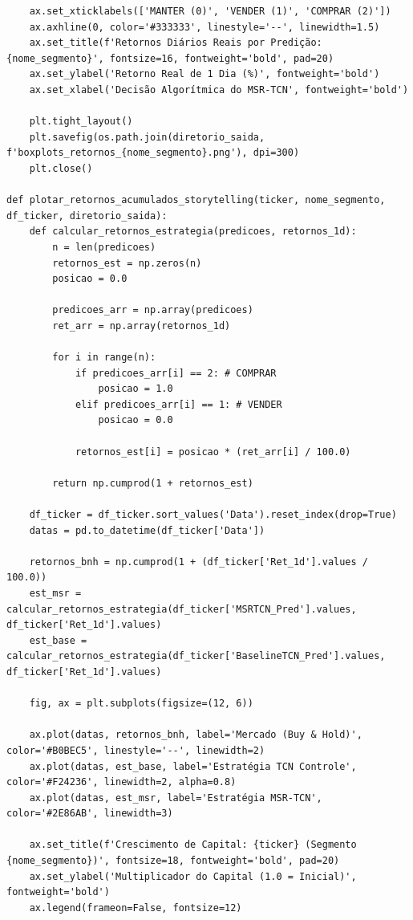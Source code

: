 \documentclass{article}
\begin{document}
\begin{verbatim}
    ax.set_xticklabels(['MANTER (0)', 'VENDER (1)', 'COMPRAR (2)'])
    ax.axhline(0, color='#333333', linestyle='--', linewidth=1.5)
    ax.set_title(f'Retornos Diários Reais por Predição: {nome_segmento}', fontsize=16, fontweight='bold', pad=20)
    ax.set_ylabel('Retorno Real de 1 Dia (%)', fontweight='bold')
    ax.set_xlabel('Decisão Algorítmica do MSR-TCN', fontweight='bold')
    
    plt.tight_layout()
    plt.savefig(os.path.join(diretorio_saida, f'boxplots_retornos_{nome_segmento}.png'), dpi=300)
    plt.close()

def plotar_retornos_acumulados_storytelling(ticker, nome_segmento, df_ticker, diretorio_saida):
    def calcular_retornos_estrategia(predicoes, retornos_1d):
        n = len(predicoes)
        retornos_est = np.zeros(n)
        posicao = 0.0  
        
        predicoes_arr = np.array(predicoes)
        ret_arr = np.array(retornos_1d)
        
        for i in range(n):
            if predicoes_arr[i] == 2: # COMPRAR
                posicao = 1.0
            elif predicoes_arr[i] == 1: # VENDER
                posicao = 0.0
            
            retornos_est[i] = posicao * (ret_arr[i] / 100.0)
            
        return np.cumprod(1 + retornos_est)

    df_ticker = df_ticker.sort_values('Data').reset_index(drop=True)
    datas = pd.to_datetime(df_ticker['Data'])
    
    retornos_bnh = np.cumprod(1 + (df_ticker['Ret_1d'].values / 100.0))
    est_msr = calcular_retornos_estrategia(df_ticker['MSRTCN_Pred'].values, df_ticker['Ret_1d'].values)
    est_base = calcular_retornos_estrategia(df_ticker['BaselineTCN_Pred'].values, df_ticker['Ret_1d'].values)
    
    fig, ax = plt.subplots(figsize=(12, 6))
    
    ax.plot(datas, retornos_bnh, label='Mercado (Buy & Hold)', color='#B0BEC5', linestyle='--', linewidth=2)
    ax.plot(datas, est_base, label='Estratégia TCN Controle', color='#F24236', linewidth=2, alpha=0.8)
    ax.plot(datas, est_msr, label='Estratégia MSR-TCN', color='#2E86AB', linewidth=3)
    
    ax.set_title(f'Crescimento de Capital: {ticker} (Segmento {nome_segmento})', fontsize=18, fontweight='bold', pad=20)
    ax.set_ylabel('Multiplicador do Capital (1.0 = Inicial)', fontweight='bold')
    ax.legend(frameon=False, fontsize=12)
    

\end{verbatim}
\end{document}
